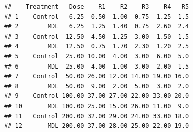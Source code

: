 \documentclass[
]{article}
\newenvironment{Shaded}{\begin{snugshade}}{\end{snugshade}}
\newcommand{\AttributeTok}[1]{\textcolor[rgb]{0.13,0.29,0.53}{#1}}
\newcommand{\ConstantTok}[1]{\textcolor[rgb]{0.56,0.35,0.01}{#1}}
\newcommand{\FunctionTok}[1]{\textcolor[rgb]{0.13,0.29,0.53}{\textbf{#1}}}
\newcommand{\NormalTok}[1]{#1}
\newcommand{\OtherTok}[1]{\textcolor[rgb]{0.56,0.35,0.01}{#1}}
\newcommand{\SpecialCharTok}[1]{\textcolor[rgb]{0.81,0.36,0.00}{\textbf{#1}}}
\newcommand{\StringTok}[1]{\textcolor[rgb]{0.31,0.60,0.02}{#1}}
\begin{document}
\begin{Shaded}
\end{Shaded}

\begin{verbatim}
##    Treatment   Dose    R1    R2    R3    R4   R5
## 1    Control   6.25  0.50  1.00  0.75  1.25  1.5
## 2        MDL   6.25  1.25  1.40  0.75  2.60  2.4
## 3    Control  12.50  4.50  1.25  3.00  1.50  1.5
## 4        MDL  12.50  0.75  1.70  2.30  1.20  2.5
## 5    Control  25.00 10.00  4.00  3.00  6.00  5.0
## 6        MDL  25.00  4.00  1.00  3.00  2.00  1.5
## 7    Control  50.00 26.00 12.00 14.00 19.00 16.0
## 8        MDL  50.00  9.00  2.00  5.00  3.00  2.0
## 9    Control 100.00 37.00 27.00 22.00 33.00 20.0
## 10       MDL 100.00 25.00 15.00 26.00 11.00  9.0
## 11   Control 200.00 32.00 29.00 24.00 33.00 18.0
## 12       MDL 200.00 37.00 28.00 25.00 22.00 19.0
\end{verbatim}
\end{document}
